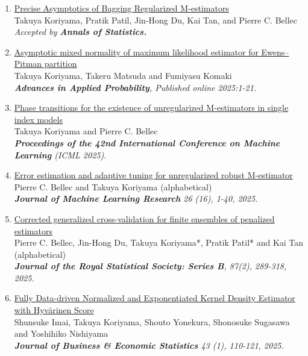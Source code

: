 \documentclass[10pt]{amsart}
\begin{document}
\begin{enumerate}
  \item \href{https://arxiv.org/abs/2409.15252}{Precise Asymptotics of Bagging Regularized M-estimators}\\
  Takuya Koriyama, Pratik Patil, Jin-Hong Du, Kai Tan, and Pierre C. Bellec \\
  \textit{Accepted by \textbf{Annals of Statistics.}}

  \item \href{https://doi.org/10.1017/apr.2025.10020}
  {Asymptotic mixed normality of maximum likelihood estimator for Ewens--Pitman partition}\\
  Takuya Koriyama, Takeru Matsuda and Fumiyasu Komaki\\
  \textit{\textbf{Advances in Applied Probability}, Published online 2025:1-21.}

  \item \href{https://arxiv.org/abs/2501.03163}{Phase transitions for the existence of unregularized M-estimators in single index models} \\
  Takuya Koriyama and Pierre C. Bellec\\
  \textit{\textbf{Proceedings of the 42nd International Conference on Machine
Learning} (ICML 2025)}.

  \item \href{https://jmlr.org/papers/v26/24-0060.html}{Error estimation and adaptive tuning for unregularized robust M-estimator}\\
  Pierre C. Bellec and Takuya Koriyama (alphabetical)\\
  \textit{\textbf{Journal of Machine Learning Research}  26 (16), 1-40, 2025.} 

  \item \href{https://doi.org/10.1093/jrsssb/qkae092}{Corrected generalized cross-validation for finite ensembles of penalized estimators}\\
  Pierre C. Bellec, Jin-Hong Du, Takuya Koriyama*, Pratik Patil* and Kai Tan (alphabetical)\\
  \textit{\textbf{Journal of the Royal Statistical Society: Series B}, 87(2), 289-318, 2025.} 

  \item  \href{https://www.tandfonline.com/doi/full/10.1080/07350015.2024.2326149?casa_token=_YOXJFqGXa0AAAAA%3AZCueJ9QbEp0N1Yvh8Bm0ieEefDcQECfZyzYWfPd2KTI_yxy9l7rt0cja6c5I4cyVJuAT7q2sfTzo}{Fully Data-driven Normalized and Exponentiated Kernel Density Estimator with Hyvärinen Score}\\
  Shunsuke Imai, Takuya Koriyama, Shouto Yonekura, Shonosuke Sugasawa and Yoshihiko Nishiyama\\
  \textit{\textbf{Journal of Business \& Economic Statistics} 43 (1), 110-121, 2025.
  }
\end{enumerate}
\end{document}
